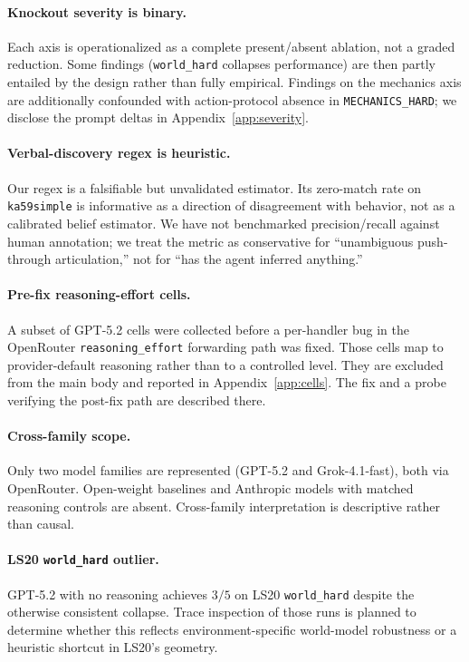 \documentclass{article}
\begin{document}
\paragraph{Knockout severity is binary.}
Each axis is operationalized as a complete present/absent ablation, not a graded reduction. Some findings (\texttt{world\_hard} collapses performance) are then partly entailed by the design rather than fully empirical. Findings on the mechanics axis are additionally confounded with action-protocol absence in \texttt{MECHANICS\_HARD}; we disclose the prompt deltas in Appendix~\ref{app:severity}.

\paragraph{Verbal-discovery regex is heuristic.}
Our regex is a falsifiable but unvalidated estimator. Its zero-match rate on \texttt{ka59simple} is informative as a direction of disagreement with behavior, not as a calibrated belief estimator. We have not benchmarked precision/recall against human annotation; we treat the metric as conservative for ``unambiguous push-through articulation,'' not for ``has the agent inferred anything.''

\paragraph{Pre-fix reasoning-effort cells.}
A subset of GPT-5.2 cells were collected before a per-handler bug in the OpenRouter \texttt{reasoning\_effort} forwarding path was fixed. Those cells map to provider-default reasoning rather than to a controlled level. They are excluded from the main body and reported in Appendix~\ref{app:cells}. The fix and a probe verifying the post-fix path are described there.

\paragraph{Cross-family scope.}
Only two model families are represented (GPT-5.2 and Grok-4.1-fast), both via OpenRouter. Open-weight baselines and Anthropic models with matched reasoning controls are absent. Cross-family interpretation is descriptive rather than causal.

\paragraph{LS20 \texttt{world\_hard} outlier.}
GPT-5.2 with no reasoning achieves $3/5$ on LS20 \texttt{world\_hard} despite the otherwise consistent collapse. Trace inspection of those runs is planned to determine whether this reflects environment-specific world-model robustness or a heuristic shortcut in LS20's geometry.
\end{document}
